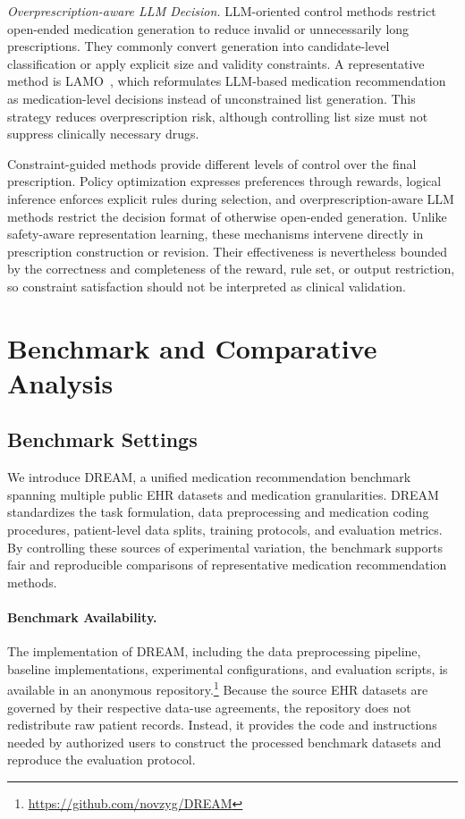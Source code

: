 \documentclass[manuscript,review]{acmart}
\begin{document}
\textit{Overprescription-aware LLM Decision.} LLM-oriented control methods restrict open-ended medication generation to reduce invalid or unnecessarily long prescriptions. They commonly convert generation into candidate-level classification or apply explicit size and validity constraints. A representative method is LAMO~\cite{zhao2025lamo}, which reformulates LLM-based medication recommendation as medication-level decisions instead of unconstrained list generation. This strategy reduces overprescription risk, although controlling list size must not suppress clinically necessary drugs.

Constraint-guided methods provide different levels of control over the final prescription. Policy optimization expresses preferences through rewards, logical inference enforces explicit rules during selection, and overprescription-aware LLM methods restrict the decision format of otherwise open-ended generation. Unlike safety-aware representation learning, these mechanisms intervene directly in prescription construction or revision. Their effectiveness is nevertheless bounded by the correctness and completeness of the reward, rule set, or output restriction, so constraint satisfaction should not be interpreted as clinical validation.

\section{Benchmark and Comparative Analysis}
\label{sec:benchmark}

\subsection{Benchmark Settings}

We introduce DREAM, a unified medication recommendation benchmark spanning multiple public EHR datasets and medication granularities. DREAM standardizes the task formulation, data preprocessing and medication coding procedures, patient-level data splits, training protocols, and evaluation metrics. By controlling these sources of experimental variation, the benchmark supports fair and reproducible comparisons of representative medication recommendation methods.

\paragraph{Benchmark Availability.}
The implementation of DREAM, including the data preprocessing pipeline, baseline implementations, experimental configurations, and evaluation scripts, is available in an anonymous repository.\footnote{\url{https://github.com/novzyg/DREAM}} Because the source EHR datasets are governed by their respective data-use agreements, the repository does not redistribute raw patient records. Instead, it provides the code and instructions needed by authorized users to construct the processed benchmark datasets and reproduce the evaluation protocol.
\end{document}
